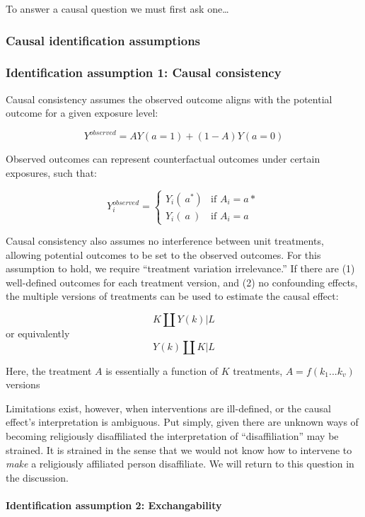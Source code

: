 \documentclass[
  singlecolumn]{article}
\let\oldparagraph\paragraph
\renewcommand{\paragraph}[1]{\oldparagraph{#1}\mbox{}}
\begin{document}
To answer a causal question we must first ask one\ldots{}

\subsubsection{Causal identification
assumptions}\label{causal-identification-assumptions}

\subsubsection{Identification assumption 1: Causal
consistency}\label{identification-assumption-1-causal-consistency}

Causal consistency assumes the observed outcome aligns with the
potential outcome for a given exposure level:

\[Y^{observed} = AY(a=1) + (1-A)Y(a=0)\]

Observed outcomes can represent counterfactual outcomes under certain
exposures, such that:

\[
Y^{observed}_i = 
\begin{cases} 
Y_i(~a^*) & \text{if } A_i = a* \\
Y_i(~a~) & \text{if } A_i = a
\end{cases}
\]

Causal consistency also assumes no interference between unit treatments,
allowing potential outcomes to be set to the observed outcomes. For this
assumption to hold, we require ``treatment variation irrelevance.'' If
there are (1) well-defined outcomes for each treatment version, and (2)
no confounding effects, the multiple versions of treatments can be used
to estimate the causal effect:

\[K \coprod Y(k) | L\] or equivalently \[Y(k) \coprod K | L\]

Here, the treatment \(A\) is essentially a function of \(K\) treatments,
\(A = f(k_1...k_v)\) versions

Limitations exist, however, when interventions are ill-defined, or the
causal effect's interpretation is ambiguous. Put simply, given there are
unknown ways of becoming religiously disaffiliated the interpretation of
``disaffiliation'' may be strained. It is strained in the sense that we
would not know how to intervene to \emph{make} a religiously affiliated
person disaffiliate. We will return to this question in the discussion.

\paragraph{Identification assumption 2:
Exchangability}\label{identification-assumption-2-exchangability}
\end{document}
